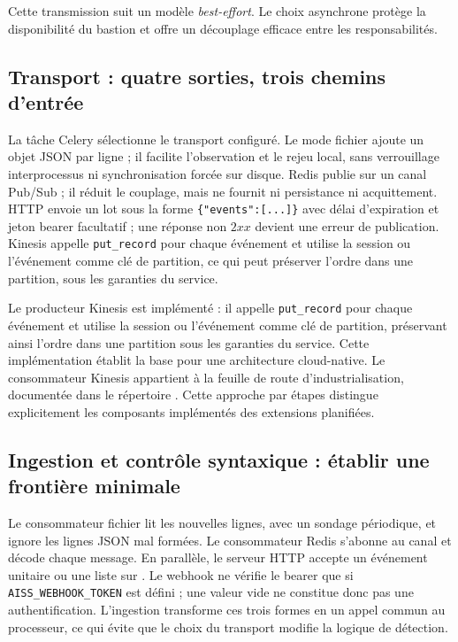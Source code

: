 \documentclass[11pt,a4paper,oneside]{report}
\theoremstyle{definition}
\theoremstyle{plain}
\begin{document}
Cette transmission suit un modèle \emph{best-effort}. Le choix asynchrone
protège la disponibilité du bastion et offre un découplage efficace entre
les responsabilités.

\subsection{Transport : quatre sorties, trois chemins d'entrée}

La tâche Celery sélectionne le transport configuré. Le mode fichier ajoute un
objet JSON par ligne ; il facilite l'observation et le rejeu local, sans
verrouillage interprocessus ni synchronisation forcée sur disque. Redis publie
sur un canal Pub/Sub ; il réduit le couplage, mais ne fournit ni persistance ni
acquittement. HTTP envoie un lot sous la forme
\texttt{\{"events":[...]\}} avec délai d'expiration et jeton bearer
facultatif ; une réponse non \(2xx\) devient une erreur de publication.
Kinesis appelle \texttt{put\_record} pour chaque événement et utilise la
session ou l'événement comme clé de partition, ce qui peut préserver l'ordre
dans une partition, sous les garanties du service.

Le producteur Kinesis est implémenté : il appelle \texttt{put\_record} pour
chaque événement et utilise la session ou l'événement comme clé de partition,
préservant ainsi l'ordre dans une partition sous les garanties du service.
Cette implémentation établit la base pour une architecture cloud-native. Le
consommateur Kinesis appartient à la feuille de route d'industrialisation,
documentée dans le répertoire . Cette
approche par étapes distingue explicitement les composants implémentés des
extensions planifiées.

\subsection{Ingestion et contrôle syntaxique : établir une frontière minimale}

Le consommateur fichier lit les nouvelles lignes, avec un sondage périodique,
et ignore les lignes JSON mal formées. Le consommateur Redis s'abonne au canal
et décode chaque message. En parallèle, le serveur HTTP accepte un événement
unitaire ou une liste sur . Le webhook ne vérifie le bearer que
si \texttt{AISS\_WEBHOOK\_TOKEN} est défini ; une valeur vide ne constitue
donc pas une authentification. L'ingestion transforme ces trois formes en un
appel commun au processeur, ce qui évite que le choix du transport modifie la
logique de détection.
\end{document}
